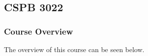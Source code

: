 \clearpage

\renewcommand{\ChapTitle}{\CSPBDataSci}
\renewcommand{\SectionTitle}{CSPB 3022}

\chapter{\ChapTitle}
\section{\SectionTitle}

\subsection{Course Overview}

The overview of this course can be seen below.


